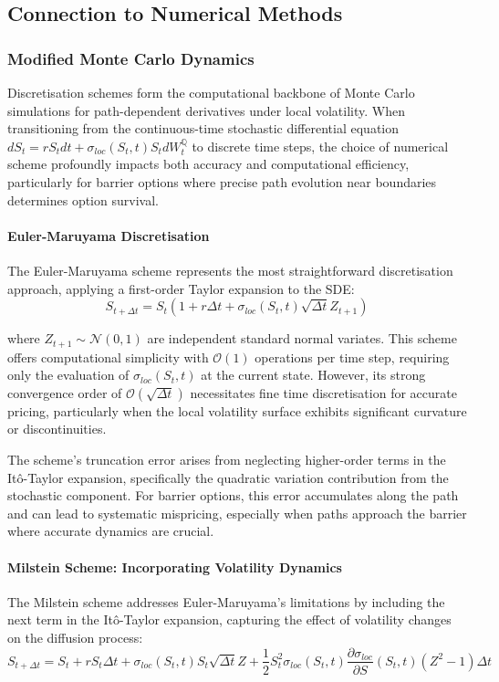 \documentclass[11pt,a4paper]{article}
\begin{document}
\subsection{Connection to Numerical Methods}

\subsubsection{Modified Monte Carlo Dynamics}

Discretisation schemes form the computational backbone of Monte Carlo simulations for path-dependent derivatives under local volatility. When transitioning from the continuous-time stochastic differential equation $dS_t = rS_t dt + \sigma_{loc}(S_t,t) S_t dW_t^{\mathbb{Q}}$ to discrete time steps, the choice of numerical scheme profoundly impacts both accuracy and computational efficiency, particularly for barrier options where precise path evolution near boundaries determines option survival.

\paragraph{Euler-Maruyama Discretisation}
The Euler-Maruyama scheme represents the most straightforward discretisation approach, applying a first-order Taylor expansion to the SDE:
\begin{equation}
S_{t+\Delta t} = S_t\left(1 + r\Delta t + \sigma_{loc}(S_t,t)\sqrt{\Delta t}Z_{t+1}\right)
\end{equation}

where $Z_{t+1} \sim \mathcal{N}(0,1)$ are independent standard normal variates. This scheme offers computational simplicity with $\mathcal{O}(1)$ operations per time step, requiring only the evaluation of $\sigma_{loc}(S_t,t)$ at the current state. However, its strong convergence order of $\mathcal{O}(\sqrt{\Delta t})$ necessitates fine time discretisation for accurate pricing, particularly when the local volatility surface exhibits significant curvature or discontinuities.

The scheme's truncation error arises from neglecting higher-order terms in the Itô-Taylor expansion, specifically the quadratic variation contribution from the stochastic component. For barrier options, this error accumulates along the path and can lead to systematic mispricing, especially when paths approach the barrier where accurate dynamics are crucial.

\paragraph{Milstein Scheme: Incorporating Volatility Dynamics}
The Milstein scheme addresses Euler-Maruyama's limitations by including the next term in the Itô-Taylor expansion, capturing the effect of volatility changes on the diffusion process:
\begin{equation}
S_{t+\Delta t} = S_t + rS_t\Delta t + \sigma_{loc}(S_t,t)S_t\sqrt{\Delta t}Z + \frac{1}{2}S_t^2\sigma_{loc}(S_t,t)\frac{\partial\sigma_{loc}}{\partial S}(S_t,t)(Z^2-1)\Delta t
\end{equation}
\end{document}
